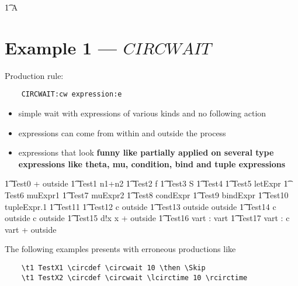 \documentclass{article}
\begin{document}
\begin{circusaction}
	\t1 A \circdef \Skip
\end{circusaction}


\section{Example 1 --- $CIRCWAIT$}

Production rule: 
\begin{verbatim}
	CIRCWAIT:cw expression:e
\end{verbatim}
%
\begin{itemize}
   \item simple wait with expressions of various kinds and no following action
   \item expressions can come from within and outside the process
   \item expressions that look {\bf funny like partially applied on several type expressions like theta, mu, condition, bind and tuple expressions}
\end{itemize}
%
\begin{circusaction}
   \t1 Test0 \circdef {} + outside
   \also
   \t1 Test1 \circdef \circwait n1+n2 
   \also
   \t1 Test2 \circdef \circwait f 
   \also
   \t1 Test3 \circdef \circwait \theta S 
   \also
   \t1 Test4 \circdef \circwait [~ x: \nat | x > 10 ~] 
   \also
   \t1 Test5 \circdef \circwait letExpr
   \also
   \t1 Test6 \circdef \circwait muExpr1
   \also
   \t1 Test7 \circdef \circwait muExpr2
   \also
   \t1 Test8 \circdef \circwait condExpr
   \also
   \t1 Test9 \circdef \circwait bindExpr
   \also
   \t1 Test10 \circdef \circwait tupleExpr.1
   \also
   \t1 Test11 \circdef {} 
   \also
   \t1 Test12 \circdef c \then \circwait outside
   \also
   \t1 Test13 \circdef \circwait outside \circseq \circwait outside
   \also
   \t1 Test14 \circdef c \then \circwait outside \circseq c \then \circwait outside
   \also
   \t1 Test15 \circdef d!x \then \circwait x + outside
   \also
   \t1 Test16 \circdef \circvres vart : \nat  \circspot \circwait vart 
   \also
   \t1 Test17 \circdef \circvres vart : \nat  \circspot c \then \circwait vart + outside
\end{circusaction}
%
The following examples presents with erroneous productions like
\begin{verbatim}
	\t1 TestX1 \circdef \circwait 10 \then \Skip
	\t1 TestX2 \circdef \circwait \lcirctime 10 \rcirctime 
\end{verbatim}
\end{document}

